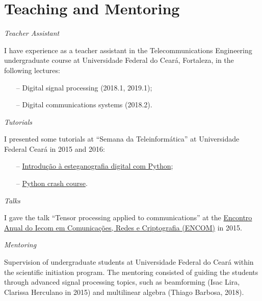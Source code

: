 \section{Teaching and Mentoring}

{\sl Teacher Assistant} 

I have experience as a teacher assistant in the Telecommunications Engineering undergraduate course at Universidade Federal do Cear\'a, Fortaleza, in the following lectures:
\begin{itemize}
	\item[--] Digital signal processing (2018.1, 2019.1);
	\item[--] Digital communications systems (2018.2).
\end{itemize}

{\sl Tutorials}

I presented some tutorials at ``Semana da Teleinformática'' at Universidade Federal Cear\'a in 2015 and 2016:
\begin{itemize}
	\item[--] \href{https://github.com/lnribeiro/setic2015/blob/master/esteganografia.ipynb}{Introdução à esteganografia digital com Python};
	\item[--] \href{https://github.com/lnribeiro/setic2015/blob/master/intropython.ipynb}{Python crash course}.
\end{itemize}

{\sl Talks}

I gave the talk ``Tensor processing applied to communications'' at the \href{https://iecom.org.br/encom2015/#}{Encontro Anual do Iecom em Comunicaç\~{o}es, Redes e Criptografia (ENCOM)} in 2015.

{\sl Mentoring}

Supervision of undergraduate students at Universidade Federal do Cear\'a within the scientific initiation program. The mentoring consisted of guiding the students through advanced signal processing topics, such as beamforming (Isac Lira, Clarissa Herculano in 2015) and multilinear algebra (Thiago Barbosa, 2018).